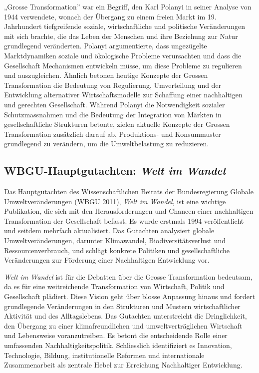 \documentclass[
  nswissgerman,
  a4paper,
  openany]{book}
\begin{document}
„Grosse Transformation'' war ein Begriff, den Karl Polanyi in seiner
Analyse von 1944 verwendete, wonach der Übergang zu einem freien Markt
im 19. Jahrhundert tiefgreifende soziale, wirtschaftliche und politische
Veränderungen mit sich brachte, die das Leben der Menschen und ihre
Beziehung zur Natur grundlegend veränderten. Polanyi argumentierte, dass
ungezügelte Marktdynamiken soziale und ökologische Probleme verursachten
und dass die Gesellschaft Mechanismen entwickeln müsse, um diese
Probleme zu regulieren und auszugleichen. Ähnlich betonen heutige
Konzepte der Grossen Transformation die Bedeutung von Regulierung,
Umverteilung und der Entwicklung alternativer Wirtschaftsmodelle zur
Schaffung einer nachhaltigen und gerechten Gesellschaft. Während Polanyi
die Notwendigkeit sozialer Schutzmassnahmen und die Bedeutung der
Integration von Märkten in gesellschaftliche Strukturen betonte, zielen
aktuelle Konzepte der Grossen Transformation zusätzlich darauf ab,
Produktions- und Konsummuster grundlegend zu verändern, um die
Umweltbelastung zu reduzieren.

\subsection{\texorpdfstring{WBGU-Hauptgutachten: \emph{Welt im
Wandel}}{WBGU-Hauptgutachten: Welt im Wandel}}\label{wbgu-hauptgutachten-welt-im-wandel}

Das Hauptgutachten des Wissenschaftlichen Beirats der Bundesregierung
Globale Umweltveränderungen (WBGU 2011), \emph{Welt im Wandel}, ist eine
wichtige Publikation, die sich mit den Herausforderungen und Chancen
einer nachhaltigen Transformation der Gesellschaft befasst. Es wurde
erstmals 1994 veröffentlicht und seitdem mehrfach aktualisiert. Das
Gutachten analysiert globale Umweltveränderungen, darunter Klimawandel,
Biodiversitätsverlust und Ressourcenverbrauch, und schlägt konkrete
Politiken und gesellschaftliche Veränderungen zur Förderung einer
Nachhaltigen Entwicklung vor.

\emph{Welt im Wandel} ist für die Debatten über die Grosse
Transformation bedeutsam, da es für eine weitreichende Transformation
von Wirtschaft, Politik und Gesellschaft plädiert. Diese Vision geht
über blosse Anpassung hinaus und fordert grundlegende Veränderungen in
den Strukturen und Mustern wirtschaftlicher Aktivität und des
Alltagslebens. Das Gutachten unterstreicht die Dringlichkeit, den
Übergang zu einer klimafreundlichen und umweltverträglichen Wirtschaft
und Lebensweise voranzutreiben. Es betont die entscheidende Rolle einer
umfassenden Nachhaltigkeitspolitik. Schliesslich identifiziert es
Innovation, Technologie, Bildung, institutionelle Reformen und
internationale Zusammenarbeit als zentrale Hebel zur Erreichung
Nachhaltiger Entwicklung.
\end{document}
